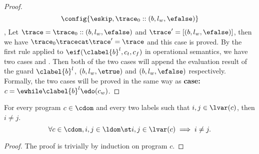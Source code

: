 \begin{proof}
\[    \config{{
    \eskip,
    \trace_0 :: (b, l_w, \efalse)}}
  \],
  Let $\trace = \trace_0 ::(b, l_w, \efalse)$ and $\trace' =  [(b, l_w, \efalse)]$,
  then we have $\trace_0 \tracecat \trace' = \trace$ and this case is proved.
  By the first rule applied to $\eif(\clabel{b}^l, c_t, c_f)$ in operational semantics,
  we have two cases  and .
  Then both of the two cases will append the evaluation result of the guard $\clabel{b}^l$, $(b, l_w, \etrue)$ and $(b, l_w, \efalse)$ respectively.
  \\
  Formally, the two cases will be proved in the same way as \textbf{case: $c = \ewhile \clabel{b}^{l} \edo (c_w)$}.
\end{proof}
\begin{lemma}
  \label{lem:label_unique}
  For every program $c \in \cdom$ and every two labels such that
  $i, j \in \lvar(c)$, then $i \neq j$.
  \[
    \forall c \in \cdom, i, j \in \ldom \st i, j \in \lvar(c)\implies i \neq j.
    \]
\end{lemma}
  \begin{proof}
    The proof is trivially by induction on program $c$.
  \end{proof}

